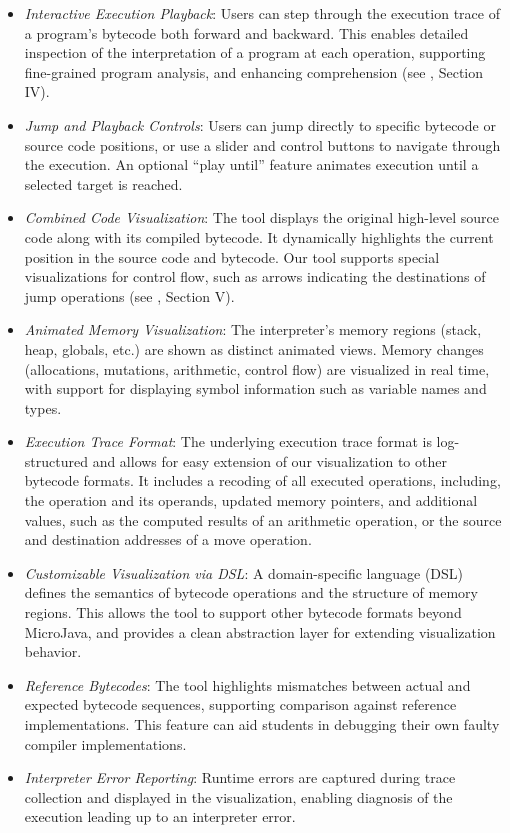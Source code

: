 \documentclass[conference]{IEEEtran}
\begin{document}
\begin{itemize}
    \item \emph{Interactive Execution Playback}: Users can step through the execution trace of a program's bytecode both forward and backward. This enables detailed inspection of the interpretation of a program at each operation, supporting fine-grained program analysis, and enhancing comprehension (see \cite{herber2025}, Section IV).

    \item \emph{Jump and Playback Controls}: Users can jump directly to specific bytecode or source code positions, or use a slider and control buttons to navigate through the execution. An optional “play until” feature animates execution until a selected target is reached.

    \item \emph{Combined Code Visualization}: The tool displays the original high-level source code along with its compiled bytecode. It dynamically highlights the current position in the source code and bytecode. Our tool supports special visualizations for control flow, such as arrows indicating the destinations of jump operations (see \cite{herber2025}, Section V).

    \item \emph{Animated Memory Visualization}: The interpreter's memory regions (stack, heap, globals, etc.) are shown as distinct animated views. Memory changes (allocations, mutations, arithmetic, control flow) are visualized in real time, with support for displaying symbol information such as variable names and types.

    \item \emph{Execution Trace Format}: The underlying execution trace format is log-structured and allows for easy extension of our visualization to other bytecode formats. It includes a recoding of all executed operations, including, the operation and its operands, updated memory pointers, and additional values, such as the computed results of an arithmetic operation, or the source and destination addresses of a move operation.

    \item \emph{Customizable Visualization via DSL}: A domain-specific language (DSL) defines the semantics of bytecode operations and the structure of memory regions. This allows the tool to support other bytecode formats beyond MicroJava, and provides a clean abstraction layer for extending visualization behavior.

    \item \emph{Reference Bytecodes}: The tool highlights mismatches between actual and expected bytecode sequences, supporting comparison against reference implementations. This feature can aid students in debugging their own faulty compiler implementations.

    \item \emph{Interpreter Error Reporting}: Runtime errors are captured during trace collection and displayed in the visualization, enabling diagnosis of the execution leading up to an interpreter error.

\end{itemize}
\end{document}
